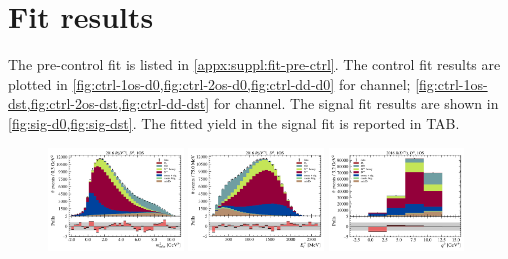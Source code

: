 \section{Fit results}
\label{ref:fit:results}

The pre-control fit is listed in \cref{appx:suppl:fit-pre-ctrl}.
The control fit results are plotted in
\cref{fig:ctrl-1os-d0,fig:ctrl-2os-d0,fig:ctrl-dd-d0} for \Dz channel;
\cref{fig:ctrl-1os-dst,fig:ctrl-2os-dst,fig:ctrl-dd-dst} for \Dstar channel.
The signal fit results are shown in
\cref{fig:sig-d0,fig:sig-dst}.
The fitted yield in the signal fit is reported in TAB.


\begin{figure}[htb]
    \centering
    \includegraphics[width=0.32\textwidth]{./figs-fit-fit-results/ctrl-fit/stacked/fit_result-stacked-D0-1os-mmiss2.pdf}
    \includegraphics[width=0.32\textwidth]{./figs-fit-fit-results/ctrl-fit/stacked/fit_result-stacked-D0-1os-el.pdf}
    \includegraphics[width=0.32\textwidth]{./figs-fit-fit-results/ctrl-fit/stacked/fit_result-stacked-D0-1os-q2.pdf}


\end{figure}
